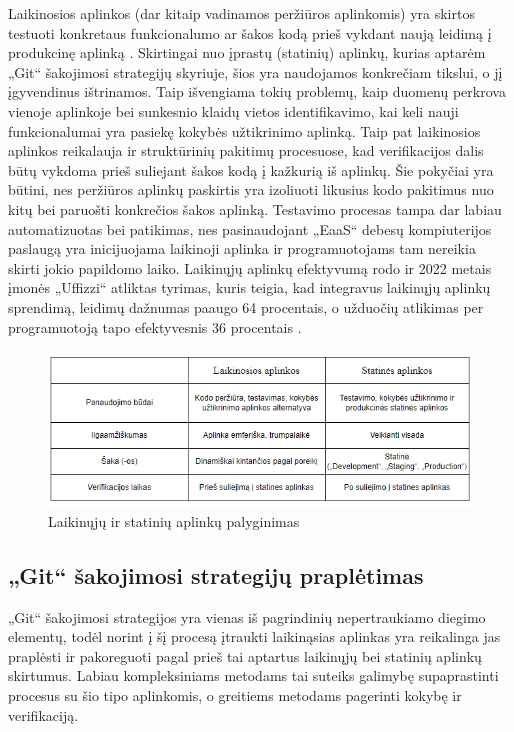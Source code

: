 \documentclass{VUMIFPSkursinis}
\begin{document}
Laikinosios aplinkos (dar kitaip vadinamos peržiūros aplinkomis) yra skirtos testuoti konkretaus funkcionalumo ar šakos kodą prieš vykdant naują leidimą į produkcinę aplinką \cite{SaltVienuoliktas}. Skirtingai nuo įprastų (statinių) aplinkų, kurias aptarėm „Git“ šakojimosi strategijų skyriuje, šios yra naudojamos konkrečiam tikslui, o jį įgyvendinus ištrinamos. Taip išvengiama tokių problemų, kaip duomenų perkrova vienoje aplinkoje bei sunkesnio klaidų vietos identifikavimo, kai keli nauji funkcionalumai yra pasiekę kokybės užtikrinimo aplinką. Taip pat laikinosios aplinkos reikalauja ir struktūrinių pakitimų procesuose, kad verifikacijos dalis būtų vykdoma prieš suliejant šakos kodą į kažkurią iš aplinkų. Šie pokyčiai yra būtini, nes peržiūros aplinkų paskirtis yra izoliuoti likusius kodo pakitimus nuo kitų bei paruošti konkrečios šakos aplinką. Testavimo procesas tampa dar labiau automatizuotas bei patikimas, nes pasinaudojant „EaaS“ debesų kompiuterijos paslaugą yra inicijuojama laikinoji aplinka ir programuotojams tam nereikia skirti jokio papildomo laiko. Laikinųjų aplinkų efektyvumą rodo ir 2022 metais įmonės „Uffizzi“ atliktas tyrimas, kuris teigia, kad integravus laikinųjų aplinkų sprendimą, leidimų dažnumas paaugo 64 procentais, o užduočių atlikimas per programuotoją tapo efektyvesnis 36 procentais \cite{SaltDvyliktas}.

\begin{figure}[H]
    \centering
    \includegraphics[scale=0.9]{img/LaikinosVsStatines.png}
    \caption{Laikinųjų ir statinių aplinkų palyginimas}
    \label{img:mlp}
\end{figure}

\subsection{„Git“ šakojimosi strategijų praplėtimas}

„Git“ šakojimosi strategijos yra vienas iš pagrindinių nepertraukiamo diegimo elementų, todėl norint į šį procesą įtraukti laikinąsias aplinkas yra reikalinga jas praplėsti ir pakoreguoti pagal prieš tai aptartus laikinųjų bei statinių aplinkų skirtumus. Labiau kompleksiniams metodams tai suteiks galimybę supaprastinti procesus su šio tipo aplinkomis, o greitiems metodams pagerinti kokybę ir verifikaciją. 
\end{document}
